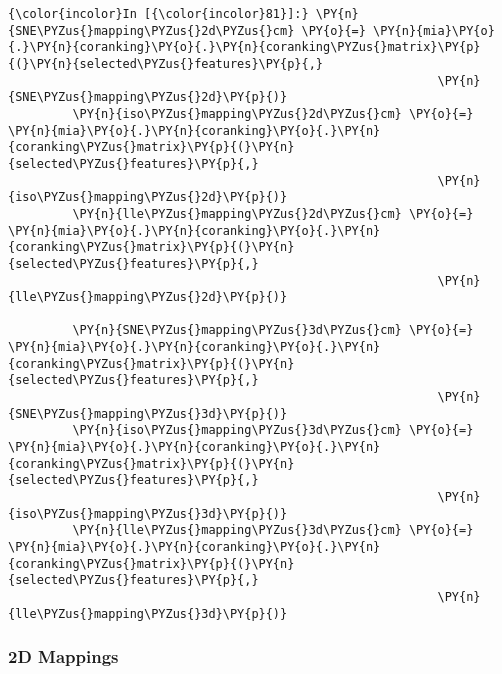     \begin{Verbatim}[commandchars=\\\{\}]
{\color{incolor}In [{\color{incolor}81}]:} \PY{n}{SNE\PYZus{}mapping\PYZus{}2d\PYZus{}cm} \PY{o}{=} \PY{n}{mia}\PY{o}{.}\PY{n}{coranking}\PY{o}{.}\PY{n}{coranking\PYZus{}matrix}\PY{p}{(}\PY{n}{selected\PYZus{}features}\PY{p}{,}
                                                            \PY{n}{SNE\PYZus{}mapping\PYZus{}2d}\PY{p}{)}
         \PY{n}{iso\PYZus{}mapping\PYZus{}2d\PYZus{}cm} \PY{o}{=} \PY{n}{mia}\PY{o}{.}\PY{n}{coranking}\PY{o}{.}\PY{n}{coranking\PYZus{}matrix}\PY{p}{(}\PY{n}{selected\PYZus{}features}\PY{p}{,}
                                                            \PY{n}{iso\PYZus{}mapping\PYZus{}2d}\PY{p}{)}
         \PY{n}{lle\PYZus{}mapping\PYZus{}2d\PYZus{}cm} \PY{o}{=} \PY{n}{mia}\PY{o}{.}\PY{n}{coranking}\PY{o}{.}\PY{n}{coranking\PYZus{}matrix}\PY{p}{(}\PY{n}{selected\PYZus{}features}\PY{p}{,}
                                                            \PY{n}{lle\PYZus{}mapping\PYZus{}2d}\PY{p}{)}

         \PY{n}{SNE\PYZus{}mapping\PYZus{}3d\PYZus{}cm} \PY{o}{=} \PY{n}{mia}\PY{o}{.}\PY{n}{coranking}\PY{o}{.}\PY{n}{coranking\PYZus{}matrix}\PY{p}{(}\PY{n}{selected\PYZus{}features}\PY{p}{,}
                                                            \PY{n}{SNE\PYZus{}mapping\PYZus{}3d}\PY{p}{)}
         \PY{n}{iso\PYZus{}mapping\PYZus{}3d\PYZus{}cm} \PY{o}{=} \PY{n}{mia}\PY{o}{.}\PY{n}{coranking}\PY{o}{.}\PY{n}{coranking\PYZus{}matrix}\PY{p}{(}\PY{n}{selected\PYZus{}features}\PY{p}{,}
                                                            \PY{n}{iso\PYZus{}mapping\PYZus{}3d}\PY{p}{)}
         \PY{n}{lle\PYZus{}mapping\PYZus{}3d\PYZus{}cm} \PY{o}{=} \PY{n}{mia}\PY{o}{.}\PY{n}{coranking}\PY{o}{.}\PY{n}{coranking\PYZus{}matrix}\PY{p}{(}\PY{n}{selected\PYZus{}features}\PY{p}{,}
                                                            \PY{n}{lle\PYZus{}mapping\PYZus{}3d}\PY{p}{)}
\end{Verbatim}

    \subsubsection{2D Mappings}\label{d-mappings}

